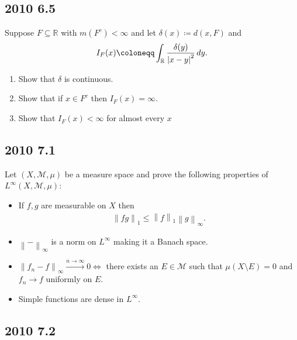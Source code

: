 \hypertarget{section-2}{%
\subsection{2010 6.5}\label{section-2}}

Suppose \(F \subseteq {\mathbb{R}}\) with \(m(F^c) < \infty\) and let
\(\delta(x) \coloneqq d(x, F)\) and
\begin{align*}
I_F(x) \coloneqq\int_{\mathbb{R}}{ \delta(y) \over {\left\lvert {x-y} \right\rvert}^2 } \,dy
.\end{align*}

\begin{enumerate}
\def\labelenumi{\alph{enumi}.}
\item
  Show that \(\delta\) is continuous.
\item
  Show that if \(x\in F^c\) then \(I_F(x) = \infty\).
\item
  Show that \(I_F(x) < \infty\) for almost every \(x\)
\end{enumerate}

\hypertarget{section-3}{%
\subsection{2010 7.1}\label{section-3}}

Let \((X, \mathcal{M}, \mu)\) be a measure space and prove the following
properties of \(L^ \infty (X, \mathcal{M}, \mu)\):

\begin{itemize}
\item
  If \(f, g\) are measurable on \(X\) then
  \begin{align*}
  {\left\lVert {fg} \right\rVert}_1 \leq {\left\lVert {f} \right\rVert}_1 {\left\lVert {g} \right\rVert}_{\infty }
  .\end{align*}
\item
  \({\left\lVert {{-}} \right\rVert}_{\infty }\) is a norm on
  \(L^{\infty }\) making it a Banach space.
\item
  \({\left\lVert {f_n - f} \right\rVert}_{\infty } \overset{n\to \infty }\to 0 \iff\)
  there exists an \(E\in \mathcal{M}\) such that
  \(\mu(X\setminus E) = 0\) and \(f_n \to f\) uniformly on \(E\).
\item
  Simple functions are dense in \(L^{\infty }\).
\end{itemize}

\hypertarget{section-4}{%
\subsection{2010 7.2}\label{section-4}}

